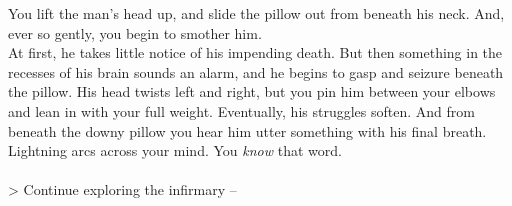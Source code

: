 You lift the man's head up, and slide the pillow out from beneath his neck. And, ever so gently, you begin to smother him.\\

At first, he takes little notice of his impending death. But then something in the recesses of his brain sounds an alarm, and he begins to gasp and seizure beneath the pillow. His head twists left and right, but you pin him between your elbows and lean in with your full weight. Eventually, his struggles soften. And from beneath the downy pillow you hear him utter something with his final breath.\\

Lightning arcs across your mind. You \emph{know} that word.\\
\\

> Continue exploring the infirmary -- 